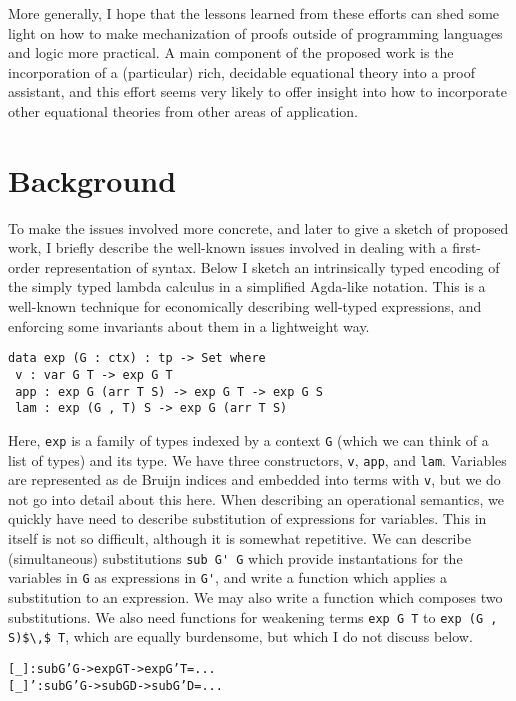 \documentclass{article}
\begin{document}
More generally, I hope that the lessons learned from these efforts can shed some light on how
to make mechanization of proofs outside of programming languages and
logic more practical. A main component of the proposed work is the
incorporation of a (particular) rich, decidable equational theory into a
proof assistant, and this effort seems very likely to offer insight into how to
incorporate other equational theories from other areas of application.


\section{Background}
To make the issues involved more concrete, and later to give a sketch
of proposed work, I briefly describe the
well-known issues involved in dealing with a first-order representation of
syntax. Below I sketch an intrinsically typed encoding of the
simply typed lambda calculus in a simplified Agda-like notation. This
is a well-known technique \cite{Benton?Coqencodingspaper} for
economically describing well-typed expressions, and enforcing some
invariants about them in a lightweight way.

\begin{verbatim}
data exp (G : ctx) : tp -> Set where
 v : var G T -> exp G T
 app : exp G (arr T S) -> exp G T -> exp G S
 lam : exp (G , T) S -> exp G (arr T S)
\end{verbatim}

Here, \lstinline{exp} is a family of types indexed by  a context
\lstinline{G} (which we can think of a list of types) and its
type. We have three constructors, \lstinline{v}, \lstinline{app}, and
\lstinline{lam}. Variables are represented as de Bruijn indices and
embedded into terms with \lstinline{v}, but we do
not go into detail about this here. When describing an operational
semantics, we quickly have need to describe substitution of
expressions for variables. This in itself is not so difficult,
although it is somewhat repetitive. We can
describe (simultaneous) substitutions \lstinline{sub G' G} which provide
instantations for the variables in \lstinline{G} as expressions in
\lstinline{G'}, and write a function which applies a substitution to
an expression. We may also write a function which composes two
substitutions. We also need functions for weakening terms
\lstinline{exp G T} to \lstinline{exp (G , S)$\,$ T}, which are equally
burdensome, but which I do not discuss below.

\begin{alltt}
[_] : sub G' G -> exp G T -> exp G' T = ...
[_]' : sub G' G -> sub G D -> sub G' D = ...
\end{alltt}
\end{document}
